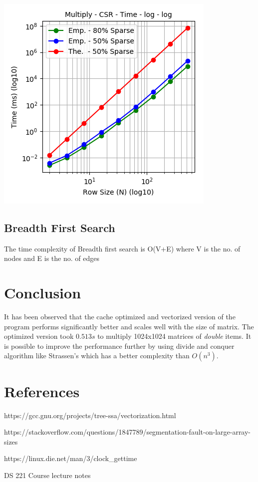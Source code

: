 \documentclass[11pt,a4paper,oneside]{article}
\begin{document}
    \begin{center}
    	\includegraphics[scale=0.6]{6.png}		
    \end{center}

    \subsection{Breadth First Search}
    
    The time complexity of Breadth first search is O(V+E) where V is the no. of nodes and E is the no. of edges

    \section{Conclusion}
    It has been observed that the cache optimized and vectorized version of the program performs significantly better and scales well with the size of matrix. The optimized version took $0.513s$ to multiply 1024x1024 matrices of \emph{double} items. It is possible to improve the performance further by using divide and conquer algorithm like Strassen's which has a better complexity than $O(n^3)$. 
    
    \section{References}
    
    \begin{list}{*}{}
    	\item https://gcc.gnu.org/projects/tree-ssa/vectorization.html
    	\item https://stackoverflow.com/questions/1847789/segmentation-fault-on-large-array-sizes
    	\item https://linux.die.net/man/3/clock\_gettime
    	\item DS 221 Course lecture notes
    \end{list}
\end{document}
